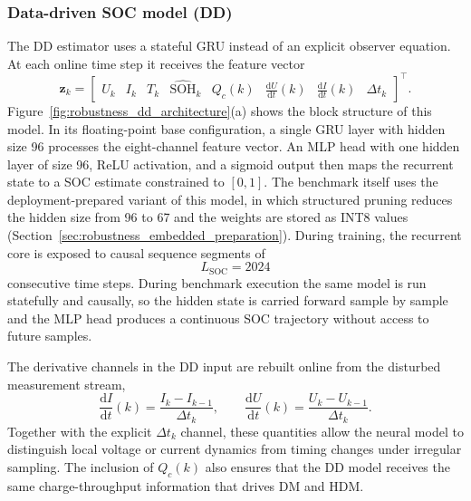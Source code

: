 \documentclass[
    a4paper,
    12pt,
    titlepage,
    bibliography=totoc,
    twoside=on,
    parskip=false,
    numbers=noenddot,
    cleardoublepage=empty,
    DIV=12,
    BCOR=12.0mm,
    headheight=36pt,
    headings=openright
]{scrreprt}
\begin{document}
\subsubsection{Data-driven SOC model (DD)}
The DD estimator uses a stateful GRU instead of an explicit observer equation. At each online time step it receives the feature vector
\begin{equation}
    \mathbf{z}_k=
    \begin{bmatrix}
        U_k & I_k & T_k & \widehat{\mathrm{SOH}}_k & Q_c(k) &
        \frac{\mathrm{d}U}{\mathrm{d}t}(k) &
        \frac{\mathrm{d}I}{\mathrm{d}t}(k) &
        \Delta t_k
    \end{bmatrix}^{\top}.
    \label{eq:robustness_dd_feature_vector}
\end{equation}
Figure~\ref{fig:robustness_dd_architecture}(a) shows the block structure of this model. In its floating-point base configuration, a single GRU layer with hidden size 96 processes the eight-channel feature vector. An MLP head with one hidden layer of size 96, ReLU activation, and a sigmoid output then maps the recurrent state to a SOC estimate constrained to $[0,1]$. The benchmark itself uses the deployment-prepared variant of this model, in which structured pruning reduces the hidden size from 96 to 67 and the weights are stored as INT8 values (Section~\ref{sec:robustness_embedded_preparation}). During training, the recurrent core is exposed to causal sequence segments of
\begin{equation}
    L_{\mathrm{SOC}}=2024
    \label{eq:robustness_soc_sequence_length}
\end{equation}
consecutive time steps. During benchmark execution the same model is run statefully and causally, so the hidden state is carried forward sample by sample and the MLP head produces a continuous SOC trajectory without access to future samples.

The derivative channels in the DD input are rebuilt online from the disturbed measurement stream,
\begin{equation}
    \frac{\mathrm{d}I}{\mathrm{d}t}(k)=\frac{I_k-I_{k-1}}{\Delta t_k},
    \qquad
    \frac{\mathrm{d}U}{\mathrm{d}t}(k)=\frac{U_k-U_{k-1}}{\Delta t_k}.
    \label{eq:robustness_derivative_features}
\end{equation}
Together with the explicit $\Delta t_k$ channel, these quantities allow the neural model to distinguish local voltage or current dynamics from timing changes under irregular sampling. The inclusion of $Q_c(k)$ also ensures that the DD model receives the same charge-throughput information that drives DM and HDM.\autocite{mondalEstimatingStateofChargeLithiumIon2024,yaoSmarterBatteryManagement2025b}
\end{document}

